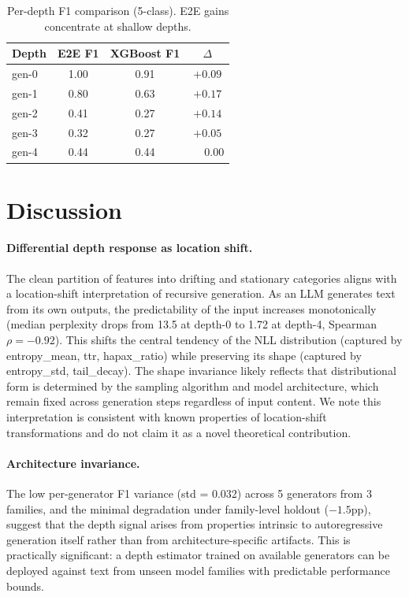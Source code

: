 \documentclass[11pt,a4paper]{article}
\begin{document}
\begin{table}[t]
\centering
\caption{Per-depth F1 comparison (5-class). E2E gains concentrate at shallow depths.}
\label{tab:e2e_perclass}
\begin{tabular}{lccc}
\toprule
Depth & E2E F1 & XGBoost F1 & $\Delta$ \\
\midrule
gen-0 & 1.00 & 0.91 & $+0.09$ \\
gen-1 & 0.80 & 0.63 & $+0.17$ \\
gen-2 & 0.41 & 0.27 & $+0.14$ \\
gen-3 & 0.32 & 0.27 & $+0.05$ \\
gen-4 & 0.44 & 0.44 & $\phantom{+}0.00$ \\
\bottomrule
\end{tabular}
\end{table}

\section{Discussion}

\paragraph{Differential depth response as location shift.} The clean partition of features into drifting and stationary categories aligns with a location-shift interpretation of recursive generation. As an LLM generates text from its own outputs, the predictability of the input increases monotonically (median perplexity drops from 13.5 at depth-0 to 1.72 at depth-4, Spearman $\rho = -0.92$). This shifts the central tendency of the NLL distribution (captured by entropy\_mean, ttr, hapax\_ratio) while preserving its shape (captured by entropy\_std, tail\_decay). The shape invariance likely reflects that distributional form is determined by the sampling algorithm and model architecture, which remain fixed across generation steps regardless of input content. We note this interpretation is consistent with known properties of location-shift transformations and do not claim it as a novel theoretical contribution.

\paragraph{Architecture invariance.} The low per-generator F1 variance (std = 0.032) across 5 generators from 3 families, and the minimal degradation under family-level holdout ($-1.5$pp), suggest that the depth signal arises from properties intrinsic to autoregressive generation itself rather than from architecture-specific artifacts. This is practically significant: a depth estimator trained on available generators can be deployed against text from unseen model families with predictable performance bounds.
\end{document}
